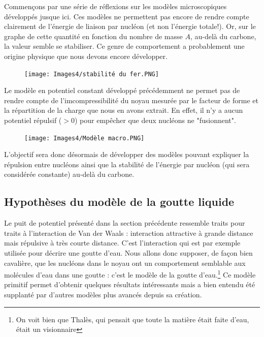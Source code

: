 Commençons par une série de réflexions sur les modèles microscopiques développés jusque ici. Ces modèles ne permettent pas encore de rendre compte clairement de l'énergie de liaison par nucléon (et non l'énergie totale!). Or, sur le graphe de cette quantité en fonction du nombre de masse $A$, au-delà du carbone, la valeur semble se stabiliser. Ce genre de comportement a probablement une origine physique que nous devons encore développer.\\ 
\begin{figure}[H]
    \centering
    \texttt{[image: Images4/stabilité du fer.PNG]}
\end{figure}
Le modèle en potentiel constant développé précédemment ne permet pas de rendre compte de l'imcompressibilité du noyau mesurée par le facteur de forme et la répartition de la charge que nous en avons extrait. En effet, il n'y a aucun potentiel répulsif ($>0$) pour empêcher que deux nucléons ne "fusionnent".\\
\begin{figure}[H]
    \centering
    \texttt{[image: Images4/Modèle macro.PNG]}
\end{figure}
L'objectif sera donc désormais de développer des modèles pouvant expliquer la répulsion entre nucléons ainsi que la stabilité de l'énergie par nucléon (qui sera considérée constante) au-delà du carbone.


\subsection{Hypothèses du modèle de la goutte liquide}


Le puit de potentiel présenté dans la section précédente ressemble traits pour traits à l'interaction de Van der Waals : interaction attractive à grande distance mais répulsive à très courte distance. C'est l'interaction qui est par exemple utilisée pour décrire une goutte d'eau. Nous allons donc supposer, de façon bien cavalière, que les nucléons dans le noyau ont un comportement semblable aux molécules d'eau dans une goutte : c'est le modèle de la goutte d'eau.\footnote{On voit bien que Thalès, qui pensait que toute la matière était faite d'eau, était un visionnaire} Ce modèle primitif permet d'obtenir quelques résultats intéressants mais a bien entendu été supplanté par d'autres modèles plus avancés depuis sa création.\\

